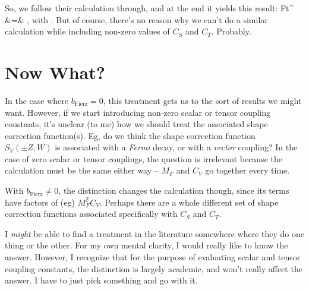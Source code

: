 So, we follow their calculation through, and at the end it yields this result:
\bea
Ft^{} &=& , 
\eea
with
\bea
\rho \approx {}.
\eea
But of course, there's no reason why we can't do a similar calculation while including non-zero values of $C_S$ and $C_T$.  Probably.

\section[Now What?]{Now What?}

In the case where $b_{\mathrm{Fierz}} = 0$, this treatment gets us to the sort of results we might want.  However, if we start introducing non-zero scalar or tensor coupling constants, it's unclear (to me) how we should treat the associated shape correction function(s).  Eg, do we think the shape correction function $S_{V}(\pm Z, W)$ is associated with a \emph{Fermi} decay, or with a \emph{vector} coupling?  In the case of %
zero scalar or tensor couplings, the question is irrelevant because the calculation must be the same either way -- $M_F$ and $C_V$ go together every time. 

With $b_{\mathrm{Fierz}} \neq 0$, the distinction changes the calculation though, since its terms have factors of (eg) $M_F^2 C_V$.
Perhaps there are a whole different set of shape correction functions associated specifically with $C_S$ and $C_T$.  

I \emph{might} be able to find a treatment in the literature somewhere where they do one thing or the other.  For my own mental clarity, I would really like to know the answer.  However, I recognize that for the purpose of evaluating scalar and tensor coupling constants, the distinction is largely academic, and won't really affect the answer.  I have to just pick something and go with it.  

